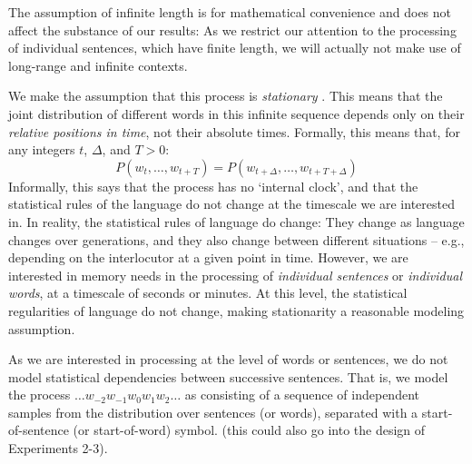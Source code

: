 \documentclass[11pt,letterpaper]{article}
\newcommand\mhahn[1]{{\color{red}(#1)}}
\begin{document}
The assumption of infinite length is for mathematical convenience and does not affect the substance of our results:
As we restrict our attention to the processing of individual sentences, which have finite length, we will actually not make use of long-range and infinite contexts.

We make the assumption that this process is \emph{stationary} \cite{doob1953stochastic}.
This means that the joint distribution of different words in this infinite sequence depends only on their \emph{relative positions in time}, not their absolute times.
Formally, this means that, for any integers $t$, $\Delta$, and $T>0$:
\begin{equation}
	P(w_t, \dots, w_{t+T}) = 	P(w_{t+\Delta}, \dots, w_{t+T+\Delta})
\end{equation}
Informally, this says that the process has no `internal clock', and that the statistical rules of the language do not change at the timescale we are interested in.
In reality, the statistical rules of language do change: They change as language changes over generations, and they also change between different situations -- e.g., depending on the interlocutor at a given point in time.
However, we are interested in memory needs in the processing of \emph{individual sentences} or \emph{individual words}, at a timescale of seconds or minutes.
At this level, the statistical regularities of language do not change, making stationarity a reasonable modeling assumption.

As we are interested in processing at the level of words or sentences, we do not model statistical dependencies between successive sentences.
That is, we model the process $\dots w_{-2} w_{-1} w_0 w_{1} w_{2} \dots$ as consisting of a sequence of independent samples from the distribution over sentences (or words), separated with a start-of-sentence (or start-of-word) symbol. \mhahn{this could also go into the design of Experiments 2-3}.
\end{document}
